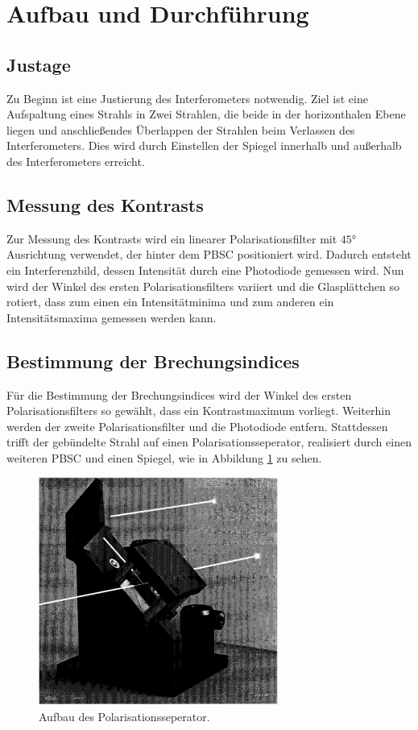 \section{Aufbau und Durchführung}
\label{sec:Durchführung}

\subsection{Justage}
Zu Beginn ist eine Justierung des Interferometers notwendig.
Ziel ist eine Aufspaltung eines Strahls in Zwei Strahlen, die beide in
der horizonthalen Ebene liegen und anschließendes Überlappen der Strahlen
beim Verlassen des Interferometers. Dies wird durch Einstellen der
Spiegel innerhalb und außerhalb des Interferometers erreicht.


\subsection{Messung des Kontrasts}
Zur Messung des Kontrasts wird ein linearer Polarisationsfilter mit $45\si{\degree}$
Ausrichtung verwendet, der hinter dem PBSC positioniert wird.
Dadurch entsteht ein Interferenzbild, dessen Intensität durch eine Photodiode gemessen wird.
Nun wird der Winkel des ersten Polarisationsfilters variiert
und die Glasplättchen so rotiert, dass zum einen ein Intensitätminima und zum anderen
ein Intensitätsmaxima gemessen werden kann.

\subsection{Bestimmung der Brechungsindices}
Für die Bestimmung der Brechungsindices wird der
Winkel des ersten Polarisationsfilters so gewählt, dass ein Kontrastmaximum vorliegt.
Weiterhin werden der zweite Polarisationsfilter und die Photodiode entfern.
Stattdessen trifft der gebündelte Strahl auf einen Polarisationsseperator, realisiert durch einen
weiteren PBSC und einen Spiegel, wie in Abbildung \ref{fig:polsep} zu sehen.
\begin{figure}
     \centering
     \includegraphics[width=0.7\textwidth]{PSBC.PNG}
     \caption{Aufbau des Polarisationsseperator.\cite{skript}}
     \label{fig:polsep}
\end{figure}


